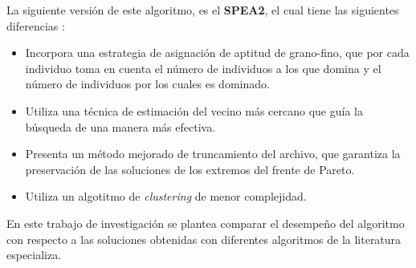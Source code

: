 \begin{itemize}
\begin{itemize}
    La siguiente versi\'on de este algoritmo, es el \textbf{SPEA2}, el cual tiene las siguientes diferencias \cite{zlt2002a}:
   
    \begin{itemize}
     \item Incorpora una estrategia de asignaci\'on de aptitud de grano-fino, que por cada individuo toma en cuenta
     el n\'umero de individuos a los que domina y el n\'umero de individuos por los cuales es dominado.
     \item Utiliza una t\'ecnica de estimaci\'on del vecino m\'as cercano que gu\'ia  la b\'usqueda de una manera
     m\'as efectiva.
     \item Presenta un m\'etodo mejorado de truncamiento del archivo, que garantiza  la preservaci\'on de las 
     soluciones de los extremos del frente de Pareto.
     \item Utiliza un algotitmo de \textit{clustering} de menor complejidad.
    \end{itemize}    
   \end{itemize}
\end{itemize}

  En este trabajo de investigaci\'on se plantea comparar el desempe\~no del algoritmo con respecto a las soluciones obtenidas con 
  diferentes algoritmos de la literatura especializa. 
  
